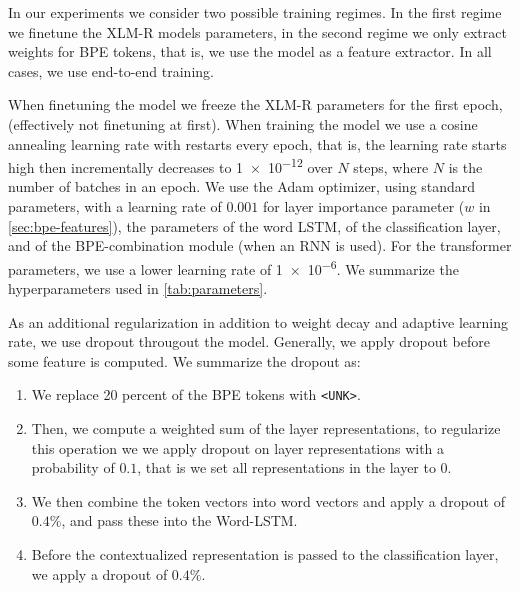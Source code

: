 \documentclass[11pt]{article}
\newcommand\citep{\cite}
\begin{document}
     In our experiments we consider two possible training regimes. In
     the first regime we finetune the XLM-R models parameters, in the
     second regime we only extract weights for BPE tokens, that is, we
     use the model as a feature extractor. In all cases, we use
     end-to-end training.
     
                             When finetuning the model we freeze the
     XLM-R parameters for the first epoch, (effectively not finetuning
     at first).  When training the model we use a cosine annealing
     learning rate \citep{loshchilov2016sgdr} with restarts every
     epoch, that is, the learning rate starts high then incrementally
     decreases to \num{1e-12} over $N$ steps, where $N$ is the
     number of batches in an epoch.  We use the Adam optimizer, using
     standard parameters, with a learning rate of $0.001$ for layer
     importance parameter ($w$ in \cref{sec:bpe-features}), the
     parameters of the word LSTM, of the classification layer, and of
     the BPE-combination module (when an RNN is used).  For the
     transformer parameters, we use a lower learning rate of
     \num{1e-6}.  We summarize the hyperparameters used in
     \cref{tab:parameters}.

            As an additional regularization in addition to weight
     decay and adaptive learning rate, we use dropout througout the
     model.  Generally, we apply dropout before some feature is
     computed. We summarize the dropout as:

    \begin{enumerate}
        \item We replace 20 percent of the BPE tokens with
     \texttt{<UNK>}.
             \item Then, we compute a weighted sum of the layer
     representations, to regularize this operation we we apply dropout
     on layer representations with a probability of $0.1$, that is we
     set all representations in the layer to $0$.
        \item We then combine the token vectors into word vectors
     and apply a dropout of $0.4\%$, and pass these into the
     Word-LSTM.
            \item Before the contextualized representation is passed
     to the classification layer, we apply a dropout of $0.4\%$.
    \end{enumerate}
    
\end{document}
